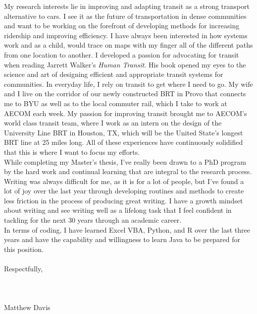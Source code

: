 \documentclass{resume} %
\begin{document}
My research interests lie in improving and adapting transit as a strong transport alternative to cars. I see it as the future of transportation in dense communities and want to be working on the forefront of developing methods for increasing ridership and improving efficiency. I have always been interested in how systems work and as a child, would trace on maps with my finger all of the different paths from one location to another. I developed a passion for advocating for transit when reading Jarrett Walker’s {\em Human Transit}. His book opened my eyes to the science and art of designing efficient and appropriate transit systems for communities. In everyday life, I rely on transit to get where I need to go. My wife and I live on the corridor of our newly constructed BRT in Provo that connects me to BYU as well as to the local commuter rail, which I take to work at AECOM each week. My passion for improving transit brought me to AECOM’s world class transit team, where I work as an intern on the design of the University Line BRT in Houston, TX, which will be the United State’s longest BRT line at 25 miles long. All of these experiences have continuously solidified that this is where I want to focus my efforts. \\

While completing my Master’s thesis, I’ve really been drawn to a PhD program by the hard work and continual learning that are integral to the research process. Writing was always difficult for me, as it is for a lot of people, but I’ve found a lot of joy over the last year through developing routines and methods to create less friction in the process of producing great writing. I have a growth mindset about writing and see writing well as a lifelong task that I feel confident in tackling for the next 30 years through an academic career.\\

In terms of coding, I have learned Excel VBA, Python, and R over the last three years and have the capability and willingness to learn Java to be prepared for this position. \\\\


Respectfully, \\\\\\\\




Matthew Davis
\end{document}

